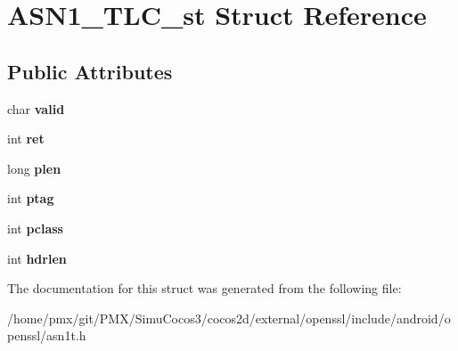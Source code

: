 \hypertarget{structASN1__TLC__st}{}\section{A\+S\+N1\+\_\+\+T\+L\+C\+\_\+st Struct Reference}
\label{structASN1__TLC__st}
\subsection*{Public Attributes}
\begin{DoxyCompactItemize}
\item 
\mbox{\label{structASN1__TLC__st_aae7c516be44ce4351b1d5666ac71ab32}} 
char {\bfseries valid}
\item 
\mbox{\label{structASN1__TLC__st_afea043db523f6ea0ca08eb16668f4992}} 
int {\bfseries ret}
\item 
\mbox{\label{structASN1__TLC__st_af587b734c7de4809c665bce45fc2b66a}} 
long {\bfseries plen}
\item 
\mbox{\label{structASN1__TLC__st_a58cd31917a573675361476d87346549a}} 
int {\bfseries ptag}
\item 
\mbox{\label{structASN1__TLC__st_a33e7ac01afc4ecad3cf6d6d6d8f929f5}} 
int {\bfseries pclass}
\item 
\mbox{\label{structASN1__TLC__st_aea820e4a42d10f37f8e095af41e0067a}} 
int {\bfseries hdrlen}
\end{DoxyCompactItemize}


The documentation for this struct was generated from the following file\+:\begin{DoxyCompactItemize}
\item 
/home/pmx/git/\+P\+M\+X/\+Simu\+Cocos3/cocos2d/external/openssl/include/android/openssl/asn1t.\+h\end{DoxyCompactItemize}
